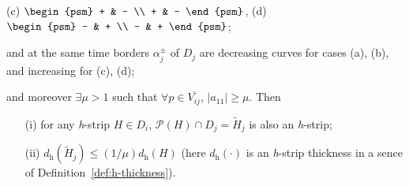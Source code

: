 \begin{theorem}
\begin{enumerate}
\begin{center}
				(c) $\begin{psm} + & - \\ + & - \end{psm}$, \quad
				(d) $\begin{psm} - & + \\ - & + \end{psm}$;		
			\end{center}
			and at the same time borders $\alpha_j^{\pm}$ of $D_j$ are decreasing curves for cases (a), (b), and increasing for (c), (d);
	\end{enumerate}
	and moreover $\exists \mu > 1$ such that $\forall p \in \overline{V_{ij}}$, $|a_{11}| \ge \mu$.
	Then
	\begin{itemize}
		\item[(i)] for any \emph{h}-strip $H \in D_i$, $\mathcal{P} (H) \cap D_j = \widetilde{H}_j$ is also an \emph{h}-strip;
		\item[(ii)] $d_{\mathrm{h}}(\widetilde{H}_j) \le (1 / \mu) d_{\mathrm{h}}(H)$ (here $d_{\mathrm{h}}(\cdot)$ is an \emph{h}-strip thickness in a sence of Definition~\ref{def:h-thickness}).
	\end{itemize}
\end{theorem}
